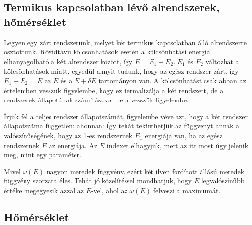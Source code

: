   \subsection{Termikus kapcsolatban lévő alrendszerek, hőmérséklet}
   
   Legyen egy zárt rendszerünk, melyet két termikus kapcsolatban álló alrendszerre osztottunk.
   Rövidtávú kölcsönhatások esetén a kölcsönhatási energia elhanyagolható a két alrendszer között, így $E=E_1+E_2$. $E_1$ és $E_2$ változhat a kölcsönhatások miatt, egyedül annyit tudunk, hogy az egész rendszer zárt, így $E_1+E_2=E$ az $E$ és a $E+\delta E$ tartományon van.
   A kölcsönhatást csak abban az értelemben vesszük figyelembe, hogy ez termalizálja a két rendszert, de a rendszerek állapotának számításakor nem vesszük figyelembe.
   
   Írjuk fel a teljes rendszer állapotszámát, figyelembe véve azt, hogy a két rendszer állapotszáma független:
   ahonnan:
   Így tehát tekinthetjük az
   függvényt annak a valószínűségének, hogy az 1-es rendszernek $E_1$ energiája van, ha az egész rendszernek $E$ az energiája.
   Az $E$ indexet elhagyjuk, mert az itt most úgy jelenik meg, mint egy paraméter. 
   
   Mivel $\omega(E)$ nagyon meredek függvény, ezért két ilyen fordított állású meredek függvény szorzata éles.
   Tehát jó közelítéssel mondhatjuk, hogy $E$ legvalószínűbb értéke megegyezik azzal az $E$-vel, ahol az $\omega(E)$ felveszi a maximumát.
   
  \subsection{Hőmérséklet}
   
